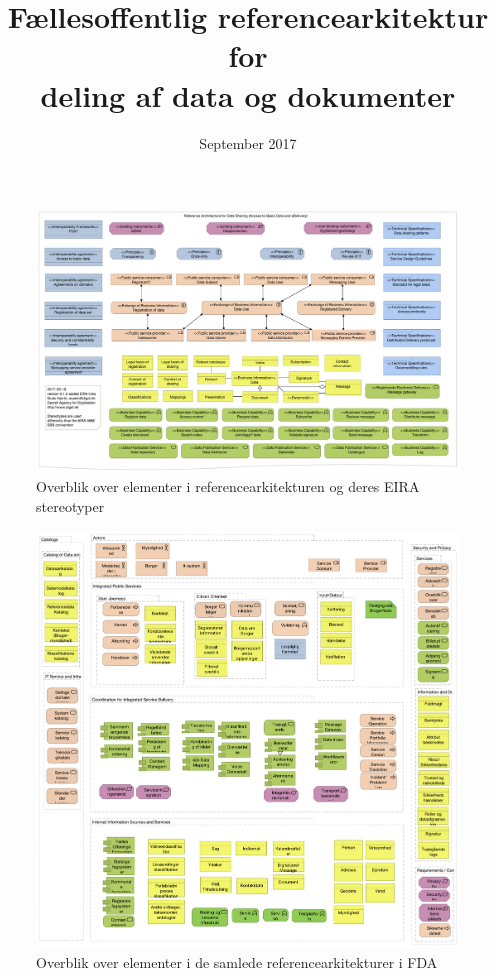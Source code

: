 \documentclass[12pt]{article}
\title{Fællesoffentlig referencearkitektur for \\ deling af data og dokumenter}
\author{}
\date{September 2017}
\begin{document}
\maketitle






\tableofcontents
\newpage
\thispagestyle{empty}
\begin{figure}
\centering
\includegraphics[angle=90, height=\textheight]{../overview.pdf}
\caption{Overblik over elementer i referencearkitekturen og deres EIRA stereotyper}
\end{figure}

\newpage
\thispagestyle{empty}
\begin{figure}
\centering
\includegraphics[angle=0, width=\textwidth]{../eco.pdf}
\caption{Overblik over elementer i de samlede referencearkitekturer i FDA}
\end{figure}
\end{document}
